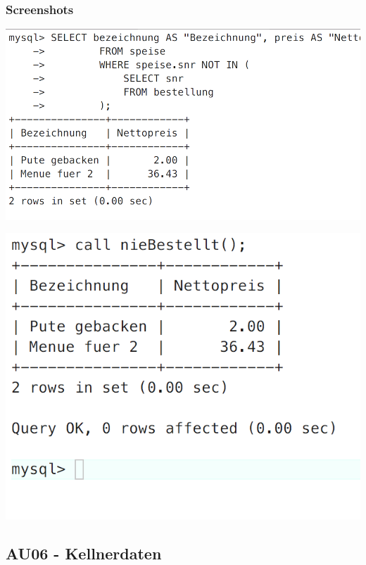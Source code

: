 \subsubsection{Screenshots}
\begin{minipage}{.5\textwidth}
	\includegraphics[width=1\linewidth]{images/s08.png}
\end{minipage}%
\begin{minipage}{.5\textwidth}
		\includegraphics[width=0.7\linewidth]{images/s09.png}
\end{minipage}

\clearpage

\subsection{AU06 - Kellnerdaten}
